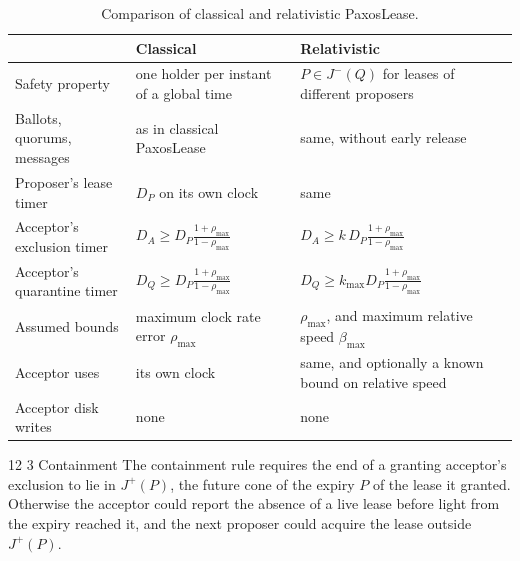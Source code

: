 \documentclass[final,5p,times,twocolumn,number]{elsarticle}
\makeatletter
\renewcommand\subsection{\@startsection{subsection}{2}{\z@}%
           {12\p@ \@plus 6\p@ \@minus 3\p@}%
           {3\p@ \@plus 6\p@ \@minus 3\p@}%
           {\normalfont\normalsize\bfseries}}
\makeatother
\begin{document}
\begin{table}[tbp]
\centering
\small
\renewcommand{\arraystretch}{1.45}
\begin{tabular}{@{}L{0.23\textwidth}L{0.29\textwidth}L{0.42\textwidth}@{}}
\toprule
 & \textbf{Classical} & \textbf{Relativistic} \\
\midrule
Safety property & one holder per instant of a global time & $P \in J^-(Q)$ for leases of different proposers \\
Ballots, quorums, messages & as in classical PaxosLease & same, without early release \\
Proposer's lease timer & $D_P$ on its own clock & same \\
Acceptor's exclusion timer & $D_A \geq D_P\frac{1+\rho_{\max}}{1-\rho_{\max}}$ & $D_A \geq k\,D_P\frac{1+\rho_{\max}}{1-\rho_{\max}}$ \\
Acceptor's quarantine timer & $D_Q \geq D_P\frac{1+\rho_{\max}}{1-\rho_{\max}}$ & $D_Q \geq k_{\max}D_P\frac{1+\rho_{\max}}{1-\rho_{\max}}$ \\
Assumed bounds & maximum clock rate error $\rho_{\max}$ & $\rho_{\max}$, and maximum relative speed $\beta_{\max}$ \\
Acceptor uses & its own clock & same, and optionally a known bound on relative speed \\
Acceptor disk writes & none & none \\
\bottomrule
\end{tabular}
\caption{\label{tab:compare}Comparison of classical and relativistic PaxosLease.}
\end{table}

\subsection{Containment}\label{sec:containment}
The containment rule requires the end of a granting acceptor's exclusion to lie in $J^+(P)$, the future cone of the expiry $P$ of the lease it granted.  Otherwise the acceptor could report the absence of a live lease before light from the expiry reached it, and the next proposer could acquire the lease outside $J^+(P)$.
\end{document}
